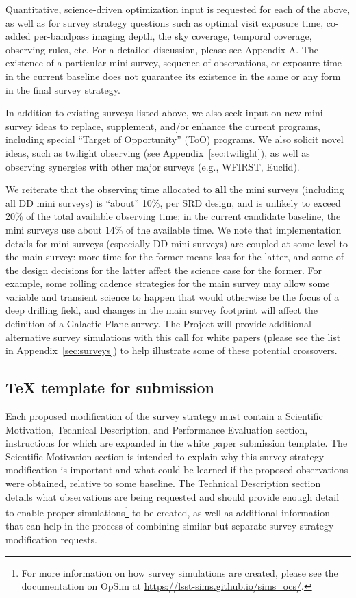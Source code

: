 \documentclass[DM,toc,usenatbib]{lsstdoc}
\begin{document}
Quantitative, science-driven optimization input is requested for each of the above, as well as 
for survey strategy questions such as optimal visit exposure time,
co-added per-bandpass imaging depth, the sky coverage, temporal coverage, observing
rules, etc.  For a detailed discussion, please see Appendix A. The existence of a particular
mini survey, sequence of observations, or exposure time in the current baseline does not 
guarantee its existence in the same or any form in the final survey strategy. 

In addition to existing surveys listed above, we also seek input on new mini survey ideas 
to replace, supplement, and/or enhance the current programs, including special ``Target of Opportunity'' (ToO) 
programs. We also solicit novel ideas, such as twilight observing (see Appendix~\ref{sec:twilight}),
as well as observing synergies with other major surveys (e.g., WFIRST, Euclid). 

We reiterate that the observing time allocated to {\bf all} the mini surveys 
(including all DD mini surveys) is ``about'' 10\%, per SRD design, and is unlikely to exceed 20\% of the total available
observing time; in the current candidate baseline, the mini surveys use about 14\% of the available time. 
We note that implementation details for mini surveys (especially DD mini surveys)
are coupled at some level to the main survey: more time for the former means less 
for the latter, and some of the design decisions for the latter affect the science
case for the former.  For example, some rolling cadence strategies for the main survey  
may allow some variable and transient science to happen that would otherwise be the 
focus of a deep drilling field, and changes in the main survey footprint will affect the 
definition of a Galactic Plane survey. The Project will provide additional alternative 
survey simulations with this call for white papers (please see the list in Appendix~\ref{sec:surveys}) 
to help illustrate some of these potential crossovers. 

\subsection{TeX template for submission \label{sec:textemplate}} 

Each proposed modification of the survey strategy must contain a Scientific Motivation, Technical Description, and Performance Evaluation section, instructions for which are expanded in the white paper submission template. The Scientific Motivation section is intended to explain why this survey strategy modification is important and what could be learned if the proposed observations were obtained, relative to some baseline. The Technical Description section details what observations are being requested and should provide enough detail to enable proper simulations\footnote{For more information on how survey simulations are created, please see the documentation on OpSim at \href{https://lsst-sims.github.io/sims_ocs/}{https://lsst-sims.github.io/sims\_ocs/}.} to be created, as well as additional information that can help in the process of combining similar but separate survey strategy modification requests. 
\end{document}
